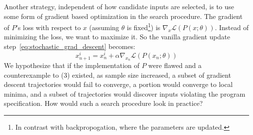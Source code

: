 \documentclass[12pt,initial,twoside,maitrise]{dms}
\numberwithin{equation}{section}
\numberwithin{table}{chapter}
\numberwithin{figure}{chapter}
\begin{document}
Another strategy, independent of how candidate inputs are selected, is to use some form of gradient based optimization in the search procedure. The gradient of $P$'s loss with respect to $x$ (assuming $\theta$ is fixed\footnote{In contrast with backpropogation, where the parameters are updated.}) is $\nabla_x \mathcal{L}(P(x; \theta))$. Instead of minimizing the loss, we want to maximize it. So the vanilla gradient update step~\ref{eq:stochastic_grad_descent} becomes:
%
\begin{equation}
    x_{n+1}^i = x_{n}^i + \alpha \nabla_{x_n} \mathcal{L}(P(x_n; \theta))
\end{equation}
%
We hypothesize that if the implementation of $P$ were flawed and a counterexample to (3) existed, as sample size increased, a subset of gradient descent trajectories would fail to converge, a portion would converge to local minima, and a subset of trajectories would discover inputs violating the program specification. How would such a search procedure look in practice?

%
%
\end{document}
